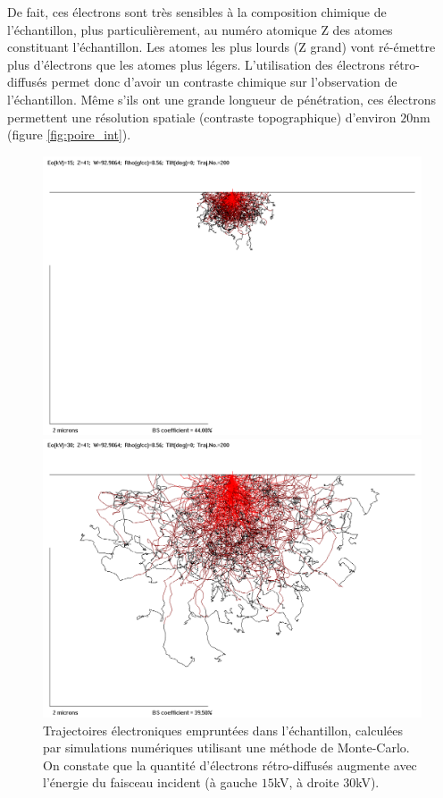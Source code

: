 \documentclass[a4paper,12pt]{article}
\begin{document}
De fait, ces électrons sont très sensibles à la composition chimique de l'échantillon, plus particulièrement, 
au numéro atomique Z des atomes constituant l'échantillon.
Les atomes les plus lourds (Z grand) vont ré-émettre plus d'électrons que les atomes plus légers. L'utilisation des électrons rétro-diffusés permet donc d'avoir un contraste chimique sur l'observation de l'échantillon.
Même s'ils ont une grande longueur de pénétration, ces électrons permettent une résolution spatiale (contraste topographique) d'environ $20$nm (figure \ref{fig:poire_int}).
\begin{figure}
\begin{minipage}[c]{.50\linewidth}
\centering
\includegraphics[width = 1 \textwidth]{images/mt_15kv.png}
\end{minipage}
\begin{minipage}[c]{.50\linewidth}
\includegraphics[width = 1 \textwidth]{images/mt_30kv.png}
\end{minipage}
\caption{Trajectoires électroniques empruntées dans l'échantillon, calculées par simulations numériques utilisant une méthode de Monte-Carlo. On constate que la quantité d'électrons rétro-diffusés augmente avec l'énergie du faisceau incident (à gauche $15$kV, à droite $30$kV).}
\label{fig:montecarlo}
\end{figure}
\end{document}
